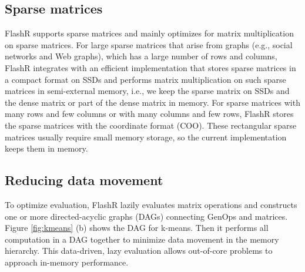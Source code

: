 
\subsection{Sparse matrices}
FlashR supports sparse matrices and mainly optimizes for matrix multiplication
on sparse matrices.
For large sparse matrices that arise from graphs (e.g., social networks
and Web graphs), which has a large number of rows and columns, FlashR integrates
with an efficient implementation \cite{SEM_SpMM} that stores sparse matrices
in a compact format on SSDs and performs matrix multiplication on such sparse
matrices in semi-external memory, i.e., we keep the sparse matrix on SSDs and
the dense matrix or part of the dense matrix in memory.
For sparse matrices with many rows and few columns or with many columns
and few rows, FlashR stores the sparse matrices with the coordinate format
(COO). These rectangular sparse matrices usually require small memory storage,
so the current implementation keeps them in memory.

\subsection{Reducing data movement}\label{sec:datamove}
To optimize evaluation, FlashR lazily evaluates matrix operations and
constructs one or more directed-acyclic graphs (DAGs) connecting GenOps and
matrices. Figure \ref{fig:kmeans} (b) shows the DAG for k-means.
Then it performs all computation in a DAG together 
to minimize data movement in the memory hierarchy.
This data-driven, lazy evaluation allows out-of-core problems 
to approach in-memory performance.

